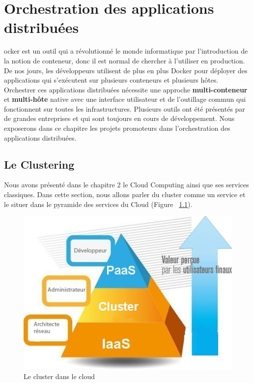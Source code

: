 \chapter{Orchestration des applications distribuées}
\begin{onehalfspace}

ocker est un outil qui a révolutionné le monde informatique par l'introduction de la notion de conteneur, donc il est normal de chercher à l'utiliser en production. De nos jours, les développeurs utilisent de plus en plus Docker pour déployer des applications qui s’exécutent sur plusieurs conteneurs et plusieurs hôtes. Orchestrer ces applications distribuées nécessite une approche \textbf{multi-conteneur} et \textbf{multi-hôte} native avec une interface utilisateur et de l'outillage commun qui fonctionnent sur toutes les infrastructures. Plusieurs outils ont été présentés par de grandes entreprises et qui sont toujours en cours de développement. Nous exposerons dans ce chapitre les projets promoteurs dans l'orchestration des applications distribuées.

\newpage

\section{Le Clustering}

Nous avons présenté dans le chapitre 2 le Cloud Computing ainsi que ses services classiques. Dans cette section, nous allons parler du cluster comme un service et le situer dans le pyramide des services du Cloud (Figure ~\ref{fig:pyramide-cluster}).

\begin{figure}[H]
\centering
\includegraphics [scale=0.7]{chapitre3/assets/pyramide}
\caption{Le cluster dans le cloud}
\label{fig:pyramide-cluster}
\end{figure}


\end{onehalfspace}
